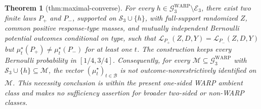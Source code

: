 \documentclass{article}
\newtheorem{theorem}{Theorem}
\begin{document}
\begin{theorem}[thm:maximal-converse]\label{thm:maximal-converse}
For every \(h\in\mathcal G^{\mathrm{WARP}}_3\setminus\mathcal E_3\), there exist two finite laws \(P_+\) and \(P_-\), supported on \(\mathcal S_3\cup\{h\}\), with full-support randomized \(Z\), common positive response-type masses, and mutually independent Bernoulli potential outcomes conditional on type, such that \(\mathcal L_{P_+}(Z,D,Y)=\mathcal L_{P_-}(Z,D,Y)\) but \(\mu_t^\star(P_+)\ne\mu_t^\star(P_-)\) for at least one \(t\). The construction keeps every Bernoulli probability in \([1/4,3/4]\). Consequently, for every \(\mathcal M\subseteq\mathcal G^{\mathrm{WARP}}_3\) with \(\mathcal S_3\cup\{h\}\subseteq\mathcal M\), the vector \((\mu_t^\star)_{t\in\mathcal B}\) is not outcome-nonrestrictively identified on \(\mathcal M\). This necessity conclusion is within the present one-sided WARP ambient class and makes no sufficiency assertion for broader two-sided or non-WARP classes.
\end{theorem}
\end{document}
